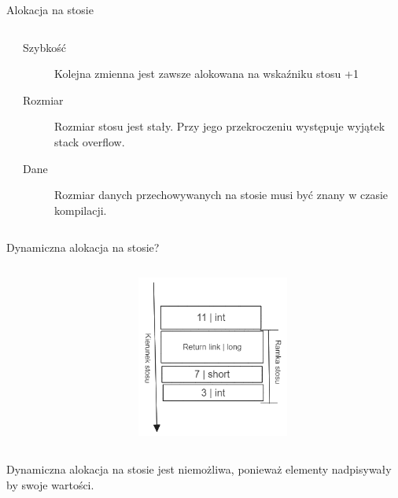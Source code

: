 \documentclass{beamer}
\begin{document}


\begin{frame}[containsverbatim]{Alokacja na stosie}
    \begin{columns}
        \begin{column}{0.3\textwidth} 
            \inputminted{cpp}{stack_alloc.cpp}
        \end{column}
        \begin{column}{0.65\textwidth} 
            \begin{description}
                \item[Szybkość] Kolejna zmienna jest zawsze alokowana na wskaźniku stosu +1
                \item[Rozmiar] Rozmiar stosu jest stały. 
                    Przy jego przekroczeniu występuje wyjątek stack overflow.
                \item[Dane] Rozmiar danych przechowywanych na stosie musi być znany w czasie kompilacji.
            \end{description}
        \end{column}
    \end{columns}
\end{frame}

\begin{frame}{Dynamiczna alokacja na stosie?}
    \begin{columns}
        \begin{column}{0.3\textwidth} 
            \inputminted{cpp}{stack_alloc.cpp}
        \end{column}
        \begin{column}{0.65\textwidth} 
        \begin{figure}
        \centering
        \includegraphics[width=5cm]{stack_of_foo.png}
        \end{figure}
        \end{column}
    \end{columns}
    \begin{block}{}
        Dynamiczna alokacja na stosie jest niemożliwa, ponieważ elementy nadpisywały by swoje wartości. 
    \end{block}
\end{frame}
    
\end{document}
